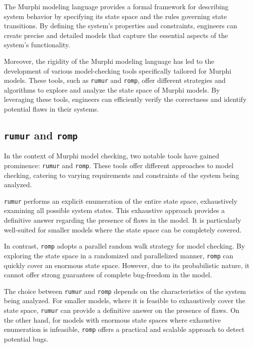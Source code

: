 The Murphi modeling language provides a formal framework for describing system
behavior by specifying its state space and the rules governing state
transitions.
By defining the system's properties and constraints, engineers can create
precise and detailed models that capture the essential aspects of the system's
functionality.

Moreover, the rigidity of the Murphi modeling language has led to the
development of various model-checking tools specifically tailored for Murphi
models.
These tools, such as \texttt{rumur} and \texttt{romp}, offer different
strategies and algorithms to explore and analyze the state space of Murphi
models.
By leveraging these tools, engineers can efficiently verify the correctness
and identify potential flaws in their systems.

\subsection{\texttt{rumur} and \texttt{romp}}\label{subsec:rumur-and-romp}

In the context of Murphi model checking, two notable tools have gained
prominence: \texttt{rumur} and \texttt{romp}.
These tools offer different approaches to model checking,
catering to varying requirements and constraints of the system being analyzed.

\texttt{rumur} performs an explicit enumeration of the entire state space,
exhaustively examining all possible system states.
This exhaustive approach provides a definitive answer regarding the presence of
flaws in the model.
It is particularly well-suited for smaller models where the state space can be
completely covered.

In contrast, \texttt{romp} adopts a parallel random walk strategy for model
checking.
By exploring the state space in a randomized and parallelized manner,
\texttt{romp} can quickly cover an enormous state space.
However, due to its probabilistic nature, it cannot offer strong guarantees of
complete bug-freedom in the model.

The choice between \texttt{rumur} and \texttt{romp} depends on the
characteristics of the system being analyzed.
For smaller models, where it is feasible to exhaustively cover the state space,
\texttt{rumur} can provide a definitive answer on the presence of flaws.
On the other hand, for models with enormous state spaces where exhaustive
enumeration is infeasible, \texttt{romp} offers a practical and scalable
approach to detect potential bugs.

